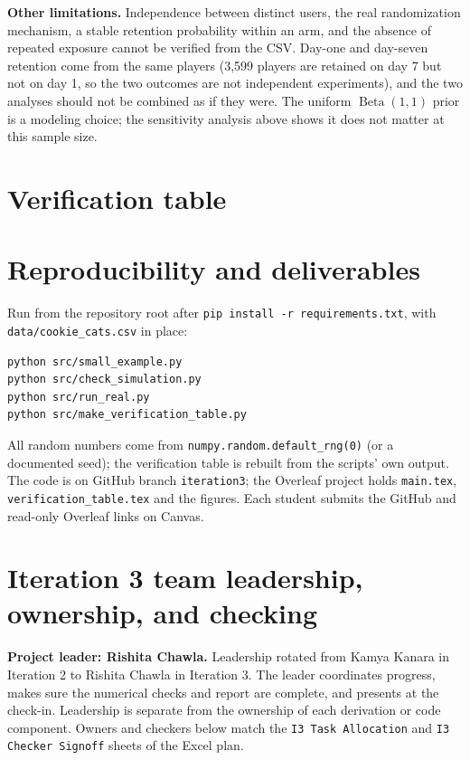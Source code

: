 \documentclass[11pt]{article}
\newcommand{\Beta}{\operatorname{Beta}}
\begin{document}
\textbf{Other limitations.} Independence between distinct users, the real randomization mechanism, a stable retention probability within an arm, and the absence of repeated exposure cannot be verified from the CSV. Day-one and day-seven retention come from the same players (3{,}599 players are retained on day 7 but not on day 1, so the two outcomes are not independent experiments), and the two analyses should not be combined as if they were. The uniform $\Beta(1,1)$ prior is a modeling choice; the sensitivity analysis above shows it does not matter at this sample size.

\section{Verification table}\label{sec:vtable}


\section{Reproducibility and deliverables}
Run from the repository root after \texttt{pip install -r requirements.txt}, with \texttt{data/cookie\_cats.csv} in place:
\begin{verbatim}
python src/small_example.py
python src/check_simulation.py
python src/run_real.py
python src/make_verification_table.py
\end{verbatim}
All random numbers come from \texttt{numpy.random.default\_rng(0)} (or a documented seed); the verification table is rebuilt from the scripts' own output. The code is on GitHub branch \texttt{iteration3}; the Overleaf project holds \texttt{main.tex}, \texttt{verification\_table.tex} and the figures. Each student submits the GitHub and read-only Overleaf links on Canvas.

\section{Iteration 3 team leadership, ownership, and checking}
\textbf{Project leader: Rishita Chawla.} Leadership rotated from Kamya Kanara in Iteration 2 to Rishita Chawla in Iteration 3. The leader coordinates progress, makes sure the numerical checks and report are complete, and presents at the check-in. Leadership is separate from the ownership of each derivation or code component. Owners and checkers below match the \texttt{I3 Task Allocation} and \texttt{I3 Checker Signoff} sheets of the Excel plan.
\end{document}
